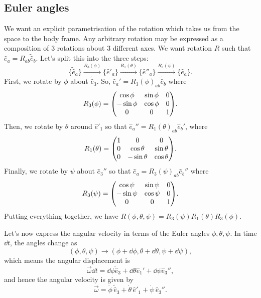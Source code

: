 \documentclass{article}
\begin{document}
\subsection{Euler angles}
We want an explicit parametrisation of the rotation which takes us from the space to the body frame. Any arbitrary rotation may be expressed as a composition of 3 rotations about 3 different axes. We want rotation $R$ such that $\hat{e}_a = R_{ab} \tilde{\hat{e}}_b$. Let's split this into the three steps:
\begin{equation}
    \{\tilde{\hat{e}}_a\} \xrightarrow{R_3(\phi)} \{\hat{e}'_a\} \xrightarrow{R_1(\theta)} \{\hat{e}''_a\} \xrightarrow{R_3(\psi)} \{\hat{e}_a\}.
\end{equation}
First, we rotate by $\phi$ about $\tilde{\hat{e}}_3$. So, $\hat{e}_a' = R_3(\phi)_{ab}\tilde{\hat{e}}_b$ where
\begin{equation}
    R_3(\phi) = \mqty(\cos\phi & \sin\phi & 0 \\ -\sin\phi & \cos\phi & 0 \\
    0 & 0 & 1).
\end{equation}
Then, we rotate by $\theta$ around $\hat{e}'_1$ so that $\hat{e}_a'' = R_1(\theta)_{ab} \hat{e}_b'$, where
\begin{equation}
    R_1(\theta) = \mqty(1 & 0 & 0 \\ 0 & \cos \theta & \sin \theta \\ 0 & -\sin\theta & \cos \theta).
\end{equation}
Finally, we rotate by $\psi$ about $\hat{e}_3''$ so that $\hat{e}_a = R_3(\psi)_{ab} \hat{e}_b''$ where
\begin{equation}
    R_3(\psi) = \mqty(\cos\psi & \sin\psi & 0 \\ -\sin\psi & \cos\psi & 0 \\
    0 & 0 & 1).
\end{equation}
Putting everything together, we have $R(\phi,\theta,\psi) = R_3(\psi)R_{1}(\theta)R_3(\phi)$.
\par
Let's now express the angular velocity in terms of the Euler angles $\phi,\theta,\psi$. In time $\dd{t}$, the angles change as
\[
    (\phi, \theta, \psi) \longrightarrow (\phi + \dd{\phi}, \theta + \dd{\theta}, \psi + \dd{\psi}),
\]
which means the angular displacement is
\[
    \vec{\omega}\dd{t} = \dd{\phi} \tilde{\hat{e}}_3 + \dd{\theta} \hat{e}_1' + \dd{\psi} \hat{e}_3'',
\]
and hence the angular velocity is given by
\begin{equation}
    \vec{\omega} = \dot{\phi}\, \tilde{\hat{e}}_3 + \dot{\theta}\,\hat{e}'_1 + \dot{\psi}\, \hat{e}_3''.
\end{equation}
\end{document}
